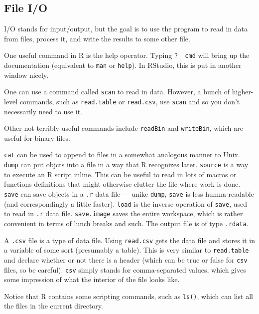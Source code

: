 \subsection{File I/O}
I/O stands for input/output, but the goal is to use the program to read in data from files, process it, and write the results to some other file.

One useful command in R is the help operator. Typing \texttt{?\,\,cmd} will bring up the documentation (equivalent to \texttt{man} or \texttt{help}). In RStudio, this is put in another window nicely.

One can use a command called \texttt{scan} to read in data. However, a bunch of higher-level commands, such as \texttt{read.table} or \texttt{read.csv}, use \texttt{scan} and so you don't necessarily need to use it.

Other not-terribly-useful commands include \texttt{readBin} and \texttt{writeBin}, which are useful for binary files.

\texttt{cat} can be used to append to files in a somewhat analogous manner to Unix. \texttt{dump} can put objcts into a file in a way that R recognizes later. \texttt{source} is a way to execute an R script inline. This can be useful to read in lots of macros or functions definitions that might otherwise clutter the file where work is done. \texttt{save} can save objects in a \texttt{.r} data file --- unike \texttt{dump}, \texttt{save} is less humna-readable (and correspondingly a little faster). \texttt{load} is the inverse operation of \texttt{save}, used to read in \texttt{.r} data file. \texttt{save.image} saves the entire workspace, which is rather convenient in terms of lunch breaks and such. The output file is of type \texttt{.rdata}.

A \texttt{.csv} file is a type of data file. Using \texttt{read.csv} gets the data file and stores it in a variable of some sort (presumably a table). This is very similar to \texttt{read.table} and declare whether or not there is a header (which can be true or false for \texttt{csv} files, so be careful). \texttt{csv} simply stands for comma-separated values, which gives some impression of what the interior of the file looks like.

Notice that R contains some scripting commands, such as \texttt{ls()}, which can list all the files in the current directory.

